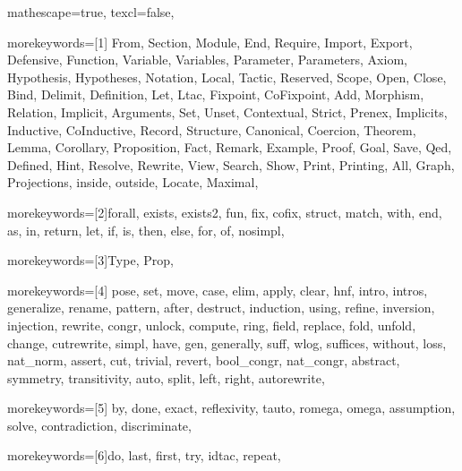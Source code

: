 
 {

mathescape=true,
texcl=false,


morekeywords=[1]{
From, Section, Module, End, Require, Import, Export, Defensive, Function,
Variable, Variables, Parameter, Parameters, Axiom, Hypothesis, Hypotheses,
Notation, Local, Tactic, Reserved, Scope, Open, Close, Bind, Delimit,
Definition, Let, Ltac, Fixpoint, CoFixpoint, Add, Morphism, Relation,
Implicit, Arguments, Set, Unset, Contextual, Strict, Prenex, Implicits,
Inductive, CoInductive, Record, Structure, Canonical, Coercion,
Theorem, Lemma, Corollary, Proposition, Fact, Remark, Example,
Proof, Goal, Save, Qed, Defined, Hint, Resolve, Rewrite, View,
Search, Show, Print, Printing, All, Graph, Projections, inside,
outside, Locate, Maximal},

morekeywords=[2]{forall, exists, exists2, fun, fix, cofix, struct,
      match, with, end, as, in, return, let, if, is, then, else,
      for, of, nosimpl},

morekeywords=[3]{Type, Prop},

morekeywords=[4]{
         pose, set, move, case, elim, apply, clear,
            hnf, intro, intros, generalize, rename, pattern, after,
	    destruct, induction, using, refine, inversion, injection,
         rewrite, congr, unlock, compute, ring, field,
            replace, fold, unfold, change, cutrewrite, simpl,
         have, gen, generally, suff, wlog, suffices, without, loss, nat_norm,
            assert, cut, trivial, revert, bool_congr, nat_congr, abstract,
	 symmetry, transitivity, auto, split, left, right, autorewrite},

morekeywords=[5]{
         by, done, exact, reflexivity, tauto, romega, omega,
         assumption, solve, contradiction, discriminate},


morekeywords=[6]{do, last, first, try, idtac, repeat},

}
